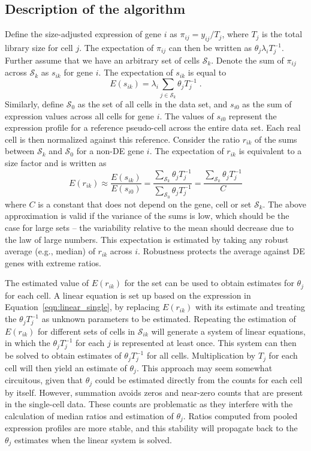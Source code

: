 \documentclass{article}
\begin{document}
\subsection{Description of the algorithm}
Define the size-adjusted expression of gene $i$ as $\pi_{ij} = y_{ij}/T_j$, where $T_j$ is the total library size for cell $j$.
The expectation of $\pi_{ij}$ can then be written as $\theta_j\lambda_i T_j^{-1}$.
Further assume that we have an arbitrary set of cells $\mathcal{S}_k$.
Denote the sum of $\pi_{ij}$ across $\mathcal{S}_k$ as $s_{ik}$ for gene $i$.
The expectation of $s_{ik}$ is equal to 
\[
    E(s_{ik}) = \lambda_i \sum_{j \in \mathcal{S}_k} \theta_j T_j^{-1}\;.
\]
Similarly, define $\mathcal{S}_0$ as the set of all cells in the data set, and $s_{i0}$ as the sum of expression values across all cells for gene $i$.
The values of $s_{i0}$ represent the expression profile for a reference pseudo-cell across the entire data set.
Each real cell is then normalized against this reference.
Consider the ratio $r_{ik}$ of the sums between $\mathcal{S}_k$ and $\mathcal{S}_0$ for a non-DE gene $i$.
The expectation of $r_{ik}$ is equivalent to a size factor and is written as
\begin{equation}
    E(r_{ik}) \approx \frac{E(s_{ik})}{E(s_{i0})} 
    = \frac{\sum_{\mathcal{S}_k} \theta_j T_j^{-1}}{\sum_{\mathcal{S}_0} \theta_j T_j^{-1}} 
    = \frac{\sum_{\mathcal{S}_k} \theta_j T_j^{-1}}{C}
    \label{eqn:linear_single}
\end{equation}
where $C$ is a constant that does not depend on the gene, cell or set $\mathcal{S}_k$.
The above approximation is valid if the variance of the sums is low, which should be the case for large sets 
    -- the variability relative to the mean should decrease due to the law of large numbers.
This expectation is estimated by taking any robust average (e.g., median) of $r_{ik}$ across $i$.
Robustness protects the average against DE genes with extreme ratios.

The estimated value of $E(r_{ik})$ for the set can be used to obtain estimates for $\theta_j$ for each cell.
A linear equation is set up based on the expression in Equation~\ref{eqn:linear_single}, 
by replacing $E(r_{ik})$ with its estimate and treating the $\theta_j T_j^{-1}$ as unknown parameters to be estimated.
Repeating the estimation of $E(r_{ik})$ for different sets of cells in $\mathcal{S}_{ik}$ will generate a system of linear equations, 
    in which the $\theta_j T_j^{-1}$ for each $j$ is represented at least once.
This system can then be solved to obtain estimates of $\theta_j T_j^{-1}$ for all cells.
Multiplication by $T_j$ for each cell will then yield an estimate of $\theta_j$.
This approach may seem somewhat circuitous, given that $\theta_j$ could be estimated directly from the counts for each cell by itself.
However, summation avoids zeros and near-zero counts that are present in the single-cell data.
These counts are problematic as they interfere with the calculation of median ratios and estimation of $\theta_j$.
Ratios computed from pooled expression profiles are more stable, and this stability will propagate back to the $\theta_j$ estimates when the linear system is solved.
\end{document}
